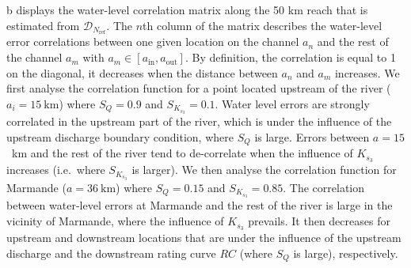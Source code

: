 b displays the water-level correlation matrix along the 50 km reach that is estimated from $\mathcal{D}_{N_{\text{ref}}}$. The $n$th column of the matrix describes the water-level error correlations between one given location on the channel $a_n$ and the rest of the channel $a_m$ with $a_m \in [a_{\text{in}}, a_{\text{out}}]$. By definition, the correlation is equal to 1 on the diagonal, it decreases when the distance between $a_n$ and $a_m$ increases. We first analyse the correlation function for a point located upstream of the river ($a_i = 15~\text{km}$) where $S_Q = 0.9$ and $S_{K_{s_3}}= 0.1$. Water level errors are strongly correlated in the upstream part of the river, which is under the influence of the upstream discharge boundary condition, where $S_Q$ is large. Errors between $a = 15$~km and the rest of the river tend to de-correlate when the influence of $K_{s_3}$ increases (i.e.~where $S_{K_{s_3}}$ is larger). We then analyse the correlation function for Marmande ($a = 36~\text{km}$) where $S_Q= 0.15$ and $S_{K_{s_3}}= 0.85$. The correlation between water-level errors at Marmande and the rest of the river is large in the vicinity of Marmande, where the influence of $K_{s_3}$ prevails. It then decreases for upstream and downstream locations that are under the influence of the upstream discharge and the downstream rating curve $RC$ (where $S_Q$ is large), respectively.
